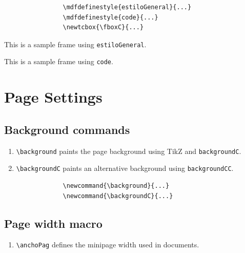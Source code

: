 \begin{minipage}{\anchoPag}
		\begin{mdframed}[style=code]
			\begin{verbatim}
				\mdfdefinestyle{estiloGeneral}{...}
				\mdfdefinestyle{code}{...}
				\newtcbox{\fboxC}{...}
			\end{verbatim}
		\end{mdframed}
		
		\begin{mdframed}[style=estiloGeneral]
			This is a sample frame using \texttt{estiloGeneral}.
		\end{mdframed}
		
		\begin{mdframed}[style=code]
			This is a sample frame using \texttt{code}.
		\end{mdframed}
		
		\section{Page Settings}\label{sec:page}
		
		\subsection{Background commands}
		
		\begin{enumerate}
			\item \texttt{\textbackslash background} paints the page background using TikZ and \texttt{backgroundC}.
			\item \texttt{\textbackslash backgroundC} paints an alternative background using \texttt{backgroundCC}.
		\end{enumerate}
		
		\begin{mdframed}[style=code]
			\begin{verbatim}
				\newcommand{\background}{...}
				\newcommand{\backgroundC}{...}
			\end{verbatim}
		\end{mdframed}
		
		\subsection{Page width macro}
		
		\begin{enumerate}
			\item \texttt{\textbackslash anchoPag} defines the minipage width used in documents.
		\end{enumerate}
		

\end{minipage}
